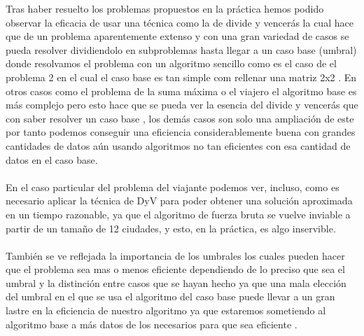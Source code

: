 \documentclass[11pt,openany]{book}
\begin{document}
Tras haber resuelto los problemas propuestos en la práctica hemos podido observar la eficacia
de usar una técnica como la de divide y vencerás la cual hace que de un problema aparentemente
extenso y con una gran variedad de casos se pueda resolver dividiendolo  en subproblemas hasta llegar
a un caso base (umbral) donde resolvamos el problema con un algoritmo sencillo como es el caso de
el problema 2 en el cual el caso base es tan simple com rellenar una matriz 2x2 . En otros casos como
el problema de la suma máxima o  el viajero  el algoritmo base es más complejo pero esto hace que se pueda ver la esencia del
divide y vencerás que con saber resolver un caso base , los demás casos son solo una ampliación de este por tanto podemos conseguir una
eficiencia considerablemente buena con grandes cantidades de datos  aún usando algoritmos no tan eficientes con esa cantidad de  datos en el caso base.
\\ \\
En el caso particular del problema del viajante podemos ver, incluso, como es necesario aplicar
la técnica de DyV para poder obtener una solución aproximada en un tiempo razonable, ya que
el algoritmo de fuerza bruta se vuelve inviable a partir de un tamaño de 12 ciudades, y esto,
en la práctica, es algo inservible.
\\ \\
También se ve reflejada la importancia de los umbrales los cuales pueden hacer que el problema sea mas o menos eficiente
dependiendo de lo preciso que sea el umbral y la distinción entre casos que se hayan  hecho ya que una mala elección
del umbral en el que se usa el algoritmo del caso base puede llevar a un gran lastre en la eficiencia de nuestro algoritmo
ya que estaremos sometiendo al algoritmo  base a más datos de los necesarios para que sea eficiente .
\end{document}
